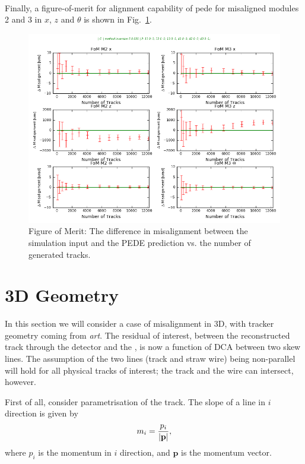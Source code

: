 \documentclass[a4paper,11pt]{article}
\begin{document}
\vspace{-0.2cm}\\
Finally, a figure-of-merit for alignment capability of pede for misaligned modules 2 and 3 in $x$, $z$ and $\theta$ is shown in Fig.~\ref{fig:PEDEFOM}.
\vspace{-0.2cm}
\begin{figure}[!ht]
\centering
\includegraphics[scale = 0.45]{fig/pedefom.png}  
    \vspace{-0.1cm}
    \caption{Figure of Merit: The difference in misalignment between the simulation input and the PEDE prediction vs. the number of generated tracks.}
\label{fig:PEDEFOM} 
\end{figure}
\vspace{-0.2cm}

\clearpage

\section{3D Geometry}\label{sec:3D}

In this section we will consider a case of misalignment in 3D, with tracker geometry coming from \textit{art}. The residual of interest, between the reconstructed track through the detector and the , is now a function of DCA between two skew lines. The assumption of the two lines (track and straw wire) being non-parallel will hold for all physical tracks of interest; the track and the wire can intersect, however. 

First of all, consider parametrisation of the track. The slope of a line in $i$ direction is given by
\begin{equation}
m_i = \frac{p_i}{|\bf{p}|}, 	
\end{equation}
where $p_i$ is the momentum in $i$ direction, and $\textbf{p}$ is the momentum vector. 
\end{document}
